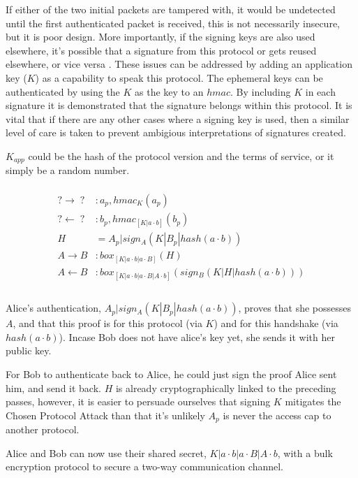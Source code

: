 \documentclass[12pt]{article}
\begin{document}
If either of the two initial packets are tampered with, it would
be undetected until the first authenticated packet is received,
this is not necessarily insecure, but it is poor design.
More importantly, if the signing keys are also used elsewhere,
it's possible that a signature from this protocol or gets
reused elsewhere, or vice versa \cite{cpa}. These issues can be
addressed by adding an application key ($K$) as a capability
to speak this protocol. The ephemeral keys can be authenticated by using
the $K$ as the key to an $hmac$. By including $K$ in each
signature it is demonstrated that the signature belongs within this
protocol. It is vital that if there are any other cases where a signing
key is used, then a similar level of care is taken to prevent ambigious
interpretations of signatures created.

$K_{app}$ could be the hash of the protocol version and the terms of service,
or it simply be a random number.

$$
\begin{align*}
\\
    ? \to \;?\;   &: a_p, hmac_{K}(a_p)   \\
    ? \gets \;?\; &: b_p, hmac_{[K|a\cdot b]}(b_p) \\
    H&=A_{p}|sign_A(K|B_p|hash(a\cdot b)) \\
    A \to B       &: box_{[K|a \cdot b | a \cdot B]}(H)\\
    A \gets B     &:
      box_{[K|a \cdot b | a \cdot B | A \cdot b]}(sign_B(K|H|hash(a\cdot b)) )\\
\\
\end{align*}
$$

Alice's authentication, $A_{p}|sign_A(K|B_p|hash(a\cdot b))$,
proves that she possesses $A$, and that this proof is for this protocol
(via $K$) and for this handshake (via $hash(a\cdot b)$).
Incase Bob does not have alice's key yet, she sends it with her public key.

For Bob to authenticate back to Alice, he could just sign the proof
Alice sent him, and send it back. $H$ is already cryptographically
linked to the preceding passes, however, it is easier to persuade
ourselves that signing $K$ mitigates the
Chosen Protocol Attack\cite{cpa} than that it's unlikely $A_p$
is never the access cap to another protocol.

Alice and Bob can now use their shared secret,
$K|a \cdot b|a \cdot B|A \cdot b$, with a bulk encryption protocol
to secure a two-way communication channel.
\end{document}
